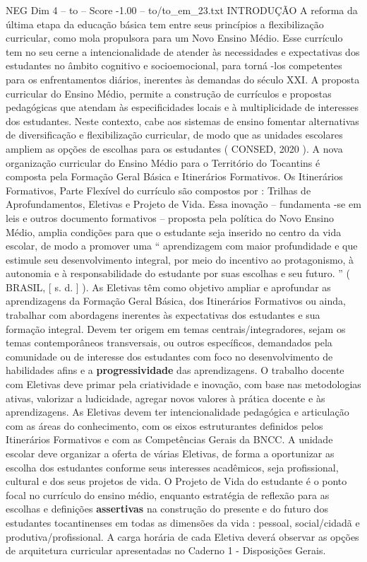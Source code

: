 \begin{textsample}{NEG Dim 4 – to – Score -1.00 – to/to\_em\_23.txt}  \label{ex:f4_neg_089}
INTRODUÇÃO A reforma da última etapa da educação básica tem entre seus princípios a flexibilização curricular, como mola propulsora para um Novo Ensino Médio.
Esse currículo tem no seu cerne a intencionalidade de atender às necessidades e expectativas dos estudantes no âmbito cognitivo e socioemocional, para torná -los competentes para os enfrentamentos diários, inerentes às demandas do século XXI.
A proposta curricular do Ensino Médio, permite a construção de currículos e propostas pedagógicas que atendam às especificidades locais e à multiplicidade de interesses dos estudantes.
Neste contexto, cabe aos sistemas de ensino fomentar alternativas de diversificação e flexibilização curricular, de modo que as unidades escolares ampliem as opções de escolhas para os estudantes ( CONSED, 2020 ).
A nova organização curricular do Ensino Médio para o Território do Tocantins é composta pela Formação Geral Básica e Itinerários Formativos.
Os Itinerários Formativos, Parte Flexível do currículo são compostos por : Trilhas de Aprofundamentos, Eletivas e Projeto de Vida.
Essa inovação – fundamenta -se em leis e outros documento formativos – proposta pela política do Novo Ensino Médio, amplia condições para que o estudante seja inserido no centro da vida escolar, de modo a promover uma “ aprendizagem com maior profundidade e que estimule seu desenvolvimento integral, por meio do incentivo ao protagonismo, à autonomia e à responsabilidade do estudante por suas escolhas e seu futuro. ” ( BRASIL, [ s. d. ] ).
As Eletivas têm como objetivo ampliar e aprofundar as aprendizagens da Formação Geral Básica, dos Itinerários Formativos ou ainda, trabalhar com abordagens inerentes às expectativas dos estudantes e sua formação integral.
Devem ter origem em temas centrais/integradores, sejam os temas contemporâneos transversais, ou outros específicos, demandados pela comunidade ou de interesse dos estudantes com foco no desenvolvimento de habilidades afins e a \textbf{progressividade} das aprendizagens.
O trabalho docente com Eletivas deve primar pela criatividade e inovação, com base nas metodologias ativas, valorizar a ludicidade, agregar novos valores à prática docente e às aprendizagens.
As Eletivas devem ter intencionalidade pedagógica e articulação com as áreas do conhecimento, com os eixos estruturantes definidos pelos Itinerários Formativos e com as Competências Gerais da BNCC.
A unidade escolar deve organizar a oferta de várias Eletivas, de forma a oportunizar as escolha dos estudantes conforme seus interesses acadêmicos, seja profissional, cultural e dos seus projetos de vida.
O Projeto de Vida do estudante é o ponto focal no currículo do ensino médio, enquanto estratégia de reflexão para as escolhas e definições \textbf{assertivas} na construção do presente e do futuro dos estudantes tocantinenses em todas as dimensões da vida : pessoal, social/cidadã e produtiva/profissional.
A carga horária de cada Eletiva deverá observar as opções de arquitetura curricular apresentadas no Caderno 1 - Disposições Gerais.

\end{textsample}
